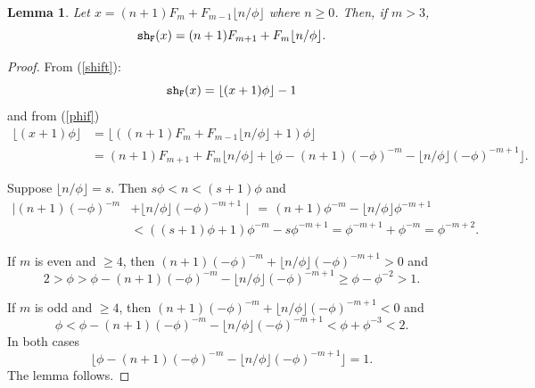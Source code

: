 \documentclass[12pt]{article}
\theoremstyle{plain}
\newtheorem{lemma}[theorem]{Lemma}
\theoremstyle{case}
\theoremstyle{definition}
\begin{document}
\bigskip

\begin{lemma}
\label{sh1}
Let $x = (n+1) F_m + F_{m-1} \lfloor n/\phi \rfloor$ where $n \geq 0$. Then, if $m > 3$,
$$
{\tt sh_F} (x)  =  (n+1) F_{m+1} + F_{m} \lfloor n/\phi \rfloor.
$$
\end{lemma}
\begin{proof}
From (\ref{shift}):
$$
{\tt sh_F} (x)  = \lfloor  (x+1) \phi \rfloor - 1 
$$
and from (\ref{phif})
\begin{align*}
\lfloor  (x+1) \phi \rfloor &= \lfloor  ((n+1) F_m + F_{m-1} \lfloor n/\phi \rfloor + 1) \phi \rfloor  \\
 &= (n+1) F_{m+1} + F_{m} \lfloor n/\phi \rfloor + \lfloor  \phi - (n+1) (-\phi)^{-m} - \lfloor n/\phi \rfloor (-\phi)^{-m+1}  \rfloor .
\end{align*}

Suppose $\lfloor n/\phi \rfloor = s$. Then $s \phi < n < (s+1) \phi$ and
\begin{align*}
\mid  (n+1) (-\phi)^{-m} & + \lfloor n/\phi \rfloor (-\phi)^{-m+1}  \mid  \, =  \, (n+1) \phi^{-m} - \lfloor n/\phi \rfloor \phi^{-m+1} \\
 & < ((s+1) \phi + 1)\phi^{-m} - s \phi^{-m+1} = \phi^{-m+1} + \phi^{-m} = \phi^{-m+2} .
 \end{align*}
 
If $m$ is even and $\geq 4$, then $(n+1) (-\phi)^{-m}  + \lfloor n/\phi \rfloor (-\phi)^{-m+1} > 0$ and
$$
2 > \phi >  \phi - (n+1) (-\phi)^{-m} - \lfloor n/\phi \rfloor (-\phi)^{-m+1} \geq \phi - \phi^{-2} > 1 .
$$

If $m$ is odd and $\geq 4$, then $(n+1) (-\phi)^{-m}  + \lfloor n/\phi \rfloor (-\phi)^{-m+1} < 0$ and
$$
\phi <  \phi - (n+1) (-\phi)^{-m} - \lfloor n/\phi \rfloor (-\phi)^{-m+1} < \phi + \phi^{-3}  < 2 .
$$
 In both cases 
$$
 \lfloor   \phi - (n+1) (-\phi)^{-m} - \lfloor n/\phi \rfloor (-\phi)^{-m+1}  \rfloor = 1 .
$$
The lemma follows.
\end{proof}

\bigskip
\end{document}

